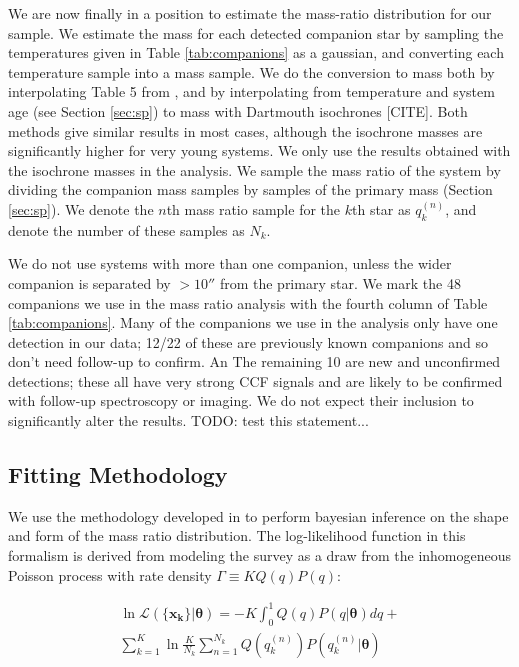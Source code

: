 \documentclass{emulateapj}
\renewcommand{\vec}[1]{\bm{#1}}
\begin{document}
We are now finally in a position to estimate the mass-ratio distribution for our sample. We estimate the mass for each detected companion star by sampling the temperatures given in Table \ref{tab:companions} as a gaussian, and converting each temperature sample into a mass sample. We do the conversion to mass both by interpolating Table 5 from \citet{Pecaut2013}, and by interpolating from temperature and system age (see Section \ref{sec:sp}) to mass with Dartmouth isochrones [CITE]. Both methods give similar results in most cases, although the isochrone masses are significantly higher for very young systems. We only use the results obtained with the isochrone masses in the analysis. We sample the mass ratio of the system by dividing the companion mass samples by samples of the primary mass (Section \ref{sec:sp}). We denote the $n$th mass ratio sample for the $k$th star as $q_k^{(n)}$, and denote the number of these samples as $N_k$.

We do not use systems with more than one companion, unless the wider companion is separated by $ > 10''$ from the primary star. We mark the 48 companions we use in the mass ratio analysis with the fourth column of Table \ref{tab:companions}. Many of the companions we use in the analysis only have one detection in our data; 12/22 of these are previously known companions and so don't need follow-up to confirm. An The remaining 10 are new and unconfirmed detections; these all have very strong CCF signals and are likely to be confirmed with follow-up spectroscopy or imaging. We do not expect their inclusion to significantly alter the results. TODO: test this statement...


\subsection{Fitting  Methodology}

We use the methodology developed in \citet{Foreman2014} to perform bayesian inference on the shape and form of the mass ratio distribution. The log-likelihood function in this formalism is derived from modeling the survey as a draw from the inhomogeneous Poisson process with rate density $\Gamma \equiv KQ(q)P(q)$:

\begin{multline}
\ln{\mathcal{L}(\{\vec{x_k}\}| \vec{\theta})} = -K \int_0^1 Q(q)P(q|\vec{\theta})dq + \\ \sum_{k=1}^K \ln{\frac{K}{N_k} \sum_{n=1}^{N_k} Q(q_k^{(n)}) P(q_k^{(n)}|\vec{\theta})}
\label{eqn:money}
\end{multline}
\end{document}
